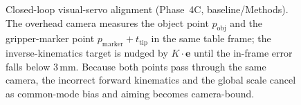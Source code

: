 \begin{figure}[t]
\caption{Closed-loop visual-servo alignment (Phase~4C, baseline/Methods). The overhead camera
measures the object point $p_{\mathrm{obj}}$ and the gripper-marker point
$p_{\mathrm{marker}}{+}t_{\mathrm{tip}}$ in the same table frame; the inverse-kinematics target is
nudged by $K\cdot\mathbf{e}$ until the in-frame error falls below $3$\,mm. Because both points pass
through the same camera, the incorrect forward kinematics and the global scale cancel as common-mode
bias and aiming becomes camera-bound.}
\label{fig:servo}
\end{figure}


